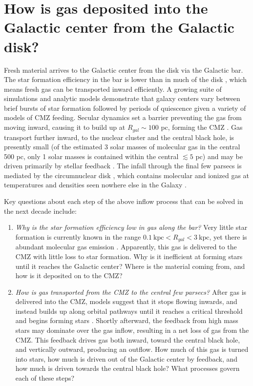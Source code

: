 \documentclass[modern]{aastex62}
\begin{document}
\section{How is gas deposited into the Galactic center from the Galactic disk?}
Fresh material arrives to the Galactic center from the disk via the Galactic bar.
The star formation efficiency in the bar is lower than in much of the disk
\citep[e.g.,][]{Muraoka2019a,Seo2019a}, which means fresh gas can be
transported inward efficiently.
A growing suite of simulations and analytic models
\citep{Krumholz2015b,Sormani2015a,Torrey2017c,Ridley2017a,Krumholz2017a,Sormani2018a,Jeffreson2018b}
demonstrate that galaxy centers vary between brief bursts of star formation 
followed by periods of quiescence given a variety of models of CMZ feeding.
Secular dynamics set a barrier preventing the gas from moving inward,
causing it to build
up at $R_{gal}\sim100$ pc, forming the CMZ \citep{Krumholz2015b}.  Gas
transport further inward, to the nuclear cluster and the central black hole, is
presently small (of the estimated 3 solar masses of molecular gas in the
central 500 pc, only 1 solar masses is contained within the central $\lesssim5$
pc) and may be driven primarily by stellar feedback
\citep[e.g.,][]{Davies2007a,Kruijssen2017a,Sormani2018b}. The infall through
the final few parsecs is mediated by the circumnuclear disk \citep[CND;
e.g.,][]{Takekawa2017a,Hsieh2017a}, which contains molecular and ionized gas
at temperatures and densities seen nowhere else in the Galaxy \citep{Mills2013b,Mills2017b}.

Key questions about each step of the above inflow process that can be solved in
the next decade include:
\begin{enumerate}
    \item 
\textit{Why is the star formation efficiency low in gas along the bar?}
Very little star formation is currently known in the range $0.1 \mathrm{~kpc} <
R_{gal} < 3 \mathrm{~kpc}$, yet there is abundant molecular gas emission
\citep[e.g.,][]{Dame2001a}.  Apparently, this gas is delivered to the CMZ
with little loss to star formation.  Why is it inefficient
at forming stars until it reaches the Galactic center?  Where is the material
coming from, and how is it deposited on to the CMZ?


    \item 
\textit{How is gas transported from the CMZ to the central few parsecs?}
After gas is delivered into the CMZ, models suggest that it stops flowing inwards, and instead builds up along orbital pathways until it reaches a critical threshold and begins forming stars
\citep{Kruijssen2014c,Krumholz2017a,Sormani2018b,Jeffreson2018b}.  Shortly
afterward, the feedback from high mass stars may dominate over the gas inflow,
resulting in a net loss of gas from the CMZ.  This feedback drives gas both
inward, toward the central black hole, and vertically outward, producing an
outflow. How much of this gas is turned into stars, how much is driven out of
the Galactic center by feedback, and how much is driven towards the central
black hole?  What processes govern each of these steps? 
\end{enumerate}
\end{document}
